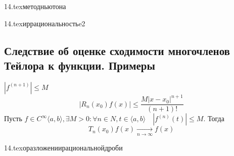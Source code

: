 {14.tex}{методньютона}

{14.tex}{иррациональностьe2}

\subsection{Следствие об оценке сходимости многочленов Тейлора к функции. Примеры}
$|f^{(n+1)}|\leq M$
$$|R_n(x_0)f(x)|\leq\frac{M|x-x_0|^{n+1}}{(n+1)!}$$
Пусть $f\in C^{\infty}\langle a,b \rangle, \exists M>0 : \forall n\in N, t\in\langle a,b \rangle \quad |f^{(n)}(t)|\leq M$. Тогда $$T_n(x_0)f(x)\xrightarrow[n\to\infty]{} f(x)$$

{14.tex}{оразложениирациональнойдроби}

